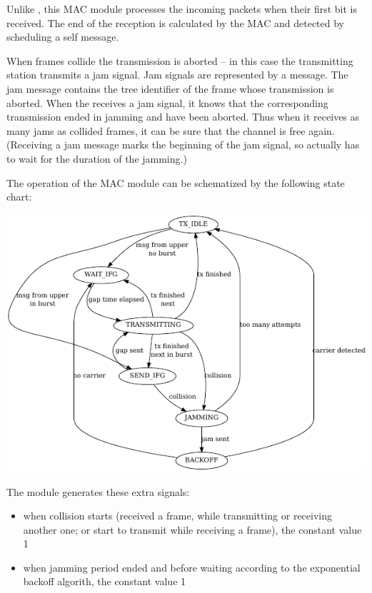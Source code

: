 Unlike , this MAC module processes the incoming packets when their
first bit is received. The end of the reception is calculated by the MAC and
detected by scheduling a self message.

When frames collide the transmission is aborted -- in this case the transmitting
station transmits a jam signal. Jam signals are represented
by a  message. The jam message contains the tree identifier
of the frame whose transmission is aborted. When the  receives a jam
signal, it knows that the corresponding transmission ended in jamming and have
been aborted. Thus when it receives as many jams as collided frames, it can
be sure that the channel is free again. (Receiving a jam message marks the
beginning of the jam signal, so actually has to wait for the duration of the jamming.)

The operation of the MAC module can be schematized by the following state chart:

\begin{center}
\includegraphics{figures/EtherMAC_txstates}
\end{center}

The module generates these extra signals:
\begin{itemize}
\item {} when collision starts (received a frame,
         while transmitting or receiving another one; or start to transmit while receiving a frame),
         the constant value 1
\item {} when jamming period ended and before waiting according to the
         exponential backoff algorith, the constant value 1
\end{itemize}

